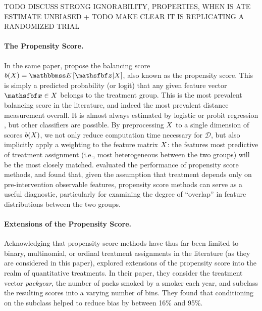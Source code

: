 \documentclass[11pt]{extarticle}
\begin{document}
TODO DISCUSS STRONG IGNORABILITY, PROPERTIES, WHEN IS ATE ESTIMATE UNBIASED
+ TODO MAKE CLEAR IT IS REPLICATING A RANDOMIZED TRIAL

\paragraph{The Propensity Score.} In the same paper, \textcite{rosenbaum_central_1983} propose the balancing score $b(\mat{X}) = \mathbbmss E \left [\vec{z} | \mat{X}\right ]$, also known as the propensity score.
This is simply a predicted probability (or logit) that any given feature vector $\vec{x} \in \mat{X}$ belongs to the treatment group.
This is the most prevalent balancing score in the literature, and indeed the most prevalent distance measurement overall. It is almost always estimated by logistic or probit regression \parencite{garrido_methods_2014}, but other classifiers are possible.
By preprocessing $X$ to a single dimension of scores $b(X)$, we not only reduce computation time necessary for $\mathcal{D}$, but also implicitly apply a weighting to the feature matrix $X$: the features most predictive of treatment assignment (i.e., most heterogeneous between the two groups) will be the most closely matched. \cite{dehejia_causal_1999} evaluated the performance of propensity score methods, and found that, given the assumption that treatment depends only on pre-intervention observable features, propensity score methods can serve as a useful diagnostic, particularly for examining the degree of ``overlap'' in feature distributions between the two groups.

\paragraph{Extensions of the Propensity Score.} Acknowledging that propensity score methods have thus far been limited to binary, multinomial, or ordinal treatment assignments in the literature (as they are considered in this paper), \textcite{imai_causal_2004} explored extensions of the propensity score into the realm of quantitative treatments. In their paper, they consider the treatment vector \emph{packyear}, the number of packs smoked by a smoker each year, and subclass the resulting scores into a varying number of bins. They found that conditioning on the subclass helped to reduce bias by between 16\% and 95\%.
\end{document}
